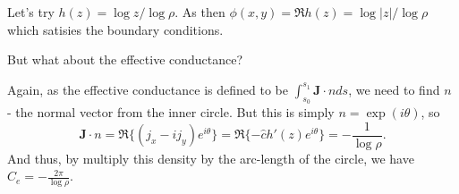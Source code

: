 \documentclass[]{article}
\begin{document}
Let's try \(h(z) = \log z / \log \rho\). As then
\(\phi(x, y) = \Re h(z) = \log \left| z \right| / \log \rho\) which
satisies the boundary conditions.

But what about the effective conductance?

Again, as the effective conductance is defined to be
\(\int_{s_0}^{s_1} \mathbf{J}\cdot n ds\), we need to find \(n\) - the
normal vector from the inner circle. But this is simply
\(n = \exp(i \theta)\), so \[
\mathbf{J} \cdot n = \Re \{(j_x - ij_y)e^{i\theta}\} = \Re\{-\hat{c} h'(z) e^{i\theta}\} = - \frac{1}{\log \rho}.
\] And thus, by multiply this density by the arc-length of the circle,
we have \(C_e = -\frac{2\pi}{\log \rho}\).
\end{document}
